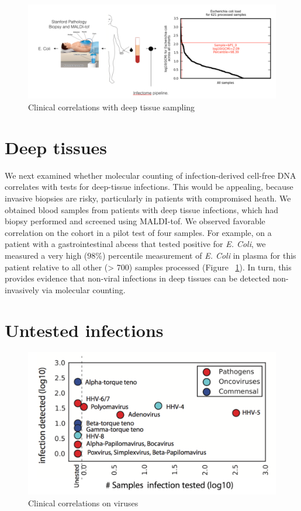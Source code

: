 \begin{figure}
\center\includegraphics[width=150mm,scale=0.5]{Figures/Fig10}
\caption{Clinical correlations with deep tissue sampling}
\label{fig:Fig10}
\end{figure}

\section{Deep tissues}

We next examined whether molecular counting of infection-derived cell-free DNA correlates with tests for deep-tissue infections. This would be appealing, because invasive biopsies are risky, particularly in patients with compromised heath. We obtained blood samples from patients with deep tissue infections, which had biopsy performed and screened using MALDI-tof. We observed favorable correlation on the cohort in a pilot test of four samples. For example, on a patient with a gastrointestinal abcess  that tested positive for \emph{E. Coli}, we measured a very high ($98\%$) percentile measurement of  \emph{E. Coli} in plasma for this patient relative to all other (> 700) samples processed (Figure ~\ref{fig:Fig10}). In turn, this provides evidence that non-viral infections in deep tissues can be detected non-invasively via molecular counting.

\section{Untested infections}

\begin{figure}
\center\includegraphics[width=150mm,scale=0.5]{Figures/Fig11}
\caption{Clinical correlations on viruses}
\label{fig:Fig11}
\end{figure}

